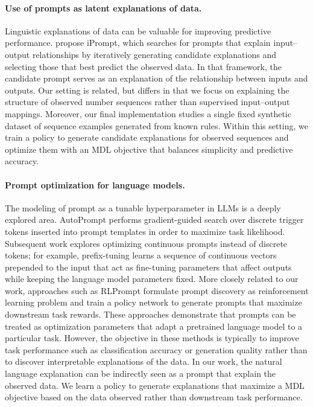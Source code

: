 \documentclass{article}
\theoremstyle{plain}
\theoremstyle{definition}
\theoremstyle{remark}
\begin{document}
\paragraph{Use of prompts as latent explanations of data.}
Linguistic explanations of data can be valuable for improving predictive performance. \citet{singh-etal-2023-explaining} propose iPrompt, which searches for prompts that explain input--output relationships by iteratively generating candidate explanations and selecting those that best predict the observed data. In that framework, the candidate prompt serves as an explanation of the relationship between inputs and outputs. Our setting is related, but differs in that we focus on explaining the structure of observed number sequences rather than supervised input--output mappings. Moreover, our final implementation studies a single fixed synthetic dataset of sequence examples generated from known rules. Within this setting, we train a policy to generate candidate explanations for observed sequences and optimize them with an MDL objective that balances simplicity and predictive accuracy.

\paragraph{Prompt optimization for language models.}
The modeling of prompt as a tunable hyperparameter in LLMs is a deeply explored area.
AutoPrompt \citep{shin-etal-2020-autoprompt} performs gradient-guided search over discrete trigger tokens inserted into prompt templates in order to maximize task likelihood. 
Subsequent work explores optimizing continuous prompts instead of discrete tokens; for example, prefix-tuning \citep{li-liang-2021-prefix} learns a sequence of continuous vectors prepended to the input that act as fine-tuning parameters that affect outputs while keeping the language model parameters fixed. More closely related to our work,
 approaches such as RLPrompt \citep{deng-rlprompt} formulate prompt discovery as reinforcement learning problem and train a policy network to generate prompts that maximize downstream task rewards. 
These approaches demonstrate that prompts can be treated as optimization parameters that adapt a pretrained language model to a particular task.
However, the objective in these methods is typically to improve task performance such as classification accuracy or generation quality rather than to discover interpretable explanations of the data. In our work, the natural language explanation can be indirectly seen as a prompt that explain the observed data. We learn a policy to generate explanations that maximize a MDL objective based on the data observed rather than downstream task performance.
\end{document}
